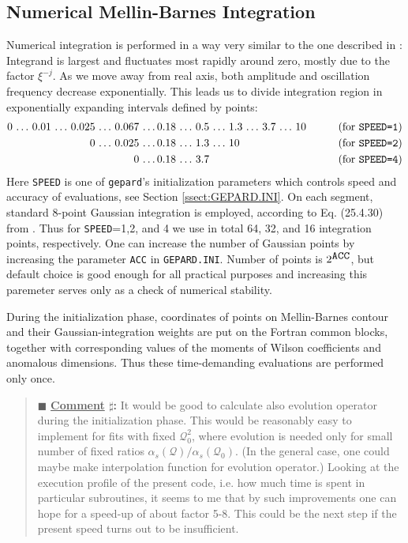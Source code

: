 \documentclass[12pt]{article}
\newcounter{comment}
\newenvironment{commblock}%
{\refstepcounter{comment}%
\begin{quote}\renewcommand{\baselinestretch}{1}
\ttfamily\small$\blacksquare$ \textbf{\underline{Comment} $\sharp$\thecomment:}}%
{\end{quote}}
\begin{document}
\subsection{Numerical Mellin-Barnes Integration}  
\label{ssect:Integration}
Numerical integration is performed in a way very similar to the one described in
\cite{Vogt:2004ns}: Integrand is largest and
fluctuates most rapidly around zero, mostly due to the factor $\xi^{-j}$. As we
move away from real axis, both
amplitude and oscillation frequency decrease exponentially.
This leads us to divide integration region in exponentially expanding intervals
defined by points:
\begin{align*}
0 \,\ldots\, 0.01 \,\ldots\, 0.025\,\ldots\, 0.067\,\ldots\,& 0.18\,\ldots\, 0.5\,\ldots\, 1.3\,\ldots\, 3.7\,\ldots\, 10&
\qquad \text{(for \texttt{SPEED=1})} \\
0  \,\ldots\, 0.025\,\ldots\,& 0.18\,\ldots\, 1.3 \,\ldots\, 10&
\qquad \text{(for \texttt{SPEED=2})} \\
0  \,\ldots\,& 0.18 \,\ldots\, 3.7&
\qquad \text{(for \texttt{SPEED=4})} \\
\label{<intervals>}
\end{align*}
Here \texttt{SPEED} is one of \texttt{gepard}'s initialization parameters which
controls speed and accuracy of evaluations, see Section \ref{ssect:GEPARD.INI}.
On each segment, standard 8-point Gaussian integration is employed, according
to Eq. (25.4.30) from \cite{AbS65}.
Thus for \texttt{SPEED}=1,2, and 4 we use in total 64, 32, and 16
integration points, respectively. 
One can increase the number of Gaussian points by increasing the parameter
\texttt{ACC} in \texttt{GEPARD.INI}. Number of points is $2^{\mbox{\texttt{ACC}}}$,
but default choice is good enough for all practical purposes and increasing this
paremeter serves only as a check of numerical stability.

During the initialization phase, coordinates of points on Mellin-Barnes contour and 
their Gaussian-integration weights
are put on the Fortran common blocks, together with corresponding values of
the moments of Wilson coefficients and anomalous dimensions. Thus these
time-demanding evaluations are performed only once.

\begin{commblock}
It would be good to calculate also evolution operator during the initialization phase.
This would be reasonably easy to implement for fits with fixed $\mathcal{Q}_{0}^2$, 
where evolution is needed only for small number of fixed ratios 
$\alpha_{s}(\mathcal{Q})/\alpha_{s}(\mathcal{Q}_0)$. (In the general case, one could
maybe make interpolation function for evolution operator.)
Looking at the execution profile of the present code, i.e. how much time is spent
in particular subroutines, it seems to me that by such improvements one can hope
for a speed-up of about factor 5-8. This could be the next step if the present
speed turns out to be insufficient.
\end{commblock}
\end{document}
